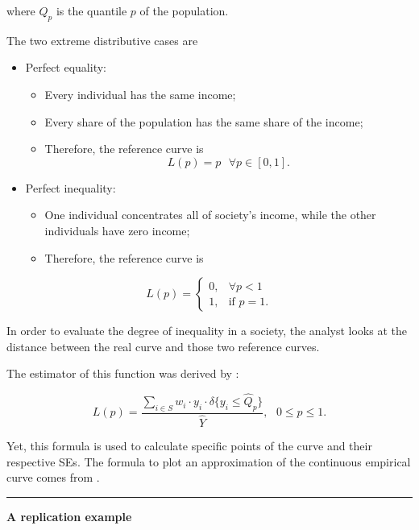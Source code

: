 \documentclass[]{book}
\providecommand{\tightlist}{%
  \setlength{\itemsep}{0pt}\setlength{\parskip}{0pt}}
\begin{document}
where \(Q_p\) is the quantile \(p\) of the population.

The two extreme distributive cases are

\begin{itemize}
\tightlist
\item
  Perfect equality:

  \begin{itemize}
  \tightlist
  \item
    Every individual has the same income;
  \item
    Every share of the population has the same share of the income;
  \item
    Therefore, the reference curve is
    \[L(p) = p \text{ } \forall p \in [0,1] \text{.}\]
  \end{itemize}
\item
  Perfect inequality:

  \begin{itemize}
  \tightlist
  \item
    One individual concentrates all of society's income, while the other
    individuals have zero income;
  \item
    Therefore, the reference curve is
  \end{itemize}
\end{itemize}

\[
L(p)=
\begin{cases}
0, &\forall p < 1 \\
1, &\text{if } p = 1 \text{.}
\end{cases}
\]

In order to evaluate the degree of inequality in a society, the analyst
looks at the distance between the real curve and those two reference
curves.

The estimator of this function was derived by \citet{kovacevic1997}:

\[
L(p) = \frac{ \sum_{i \in S} w_i \cdot y_i \cdot \delta \{ y_i \le \widehat{Q}_p \}}{\widehat{Y}}, \text{ } 0 \le p \le 1.
\]

Yet, this formula is used to calculate specific points of the curve and
their respective SEs. The formula to plot an approximation of the
continuous empirical curve comes from \citet{lerman1989}.

\begin{center}\rule{0.5\linewidth}{\linethickness}\end{center}

\textbf{A replication example}
\end{document}
